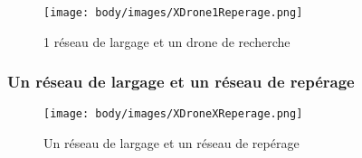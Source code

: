 \begin{figure}[H]
    \begin{center}
        \texttt{[image: body/images/XDrone1Reperage.png]}
    \end{center}
    \caption{1 réseau de largage et un drone de recherche}
    \label{fig:XDrone1Repererage}
\end{figure}


\subsubsection{Un réseau de largage et un réseau de repérage}

\begin{figure}[H]
    \begin{center}
        \texttt{[image: body/images/XDroneXReperage.png]}
    \end{center}
    \caption{Un réseau de largage et un réseau de repérage}
    \label{fig:XDroneXReperage}
\end{figure}

